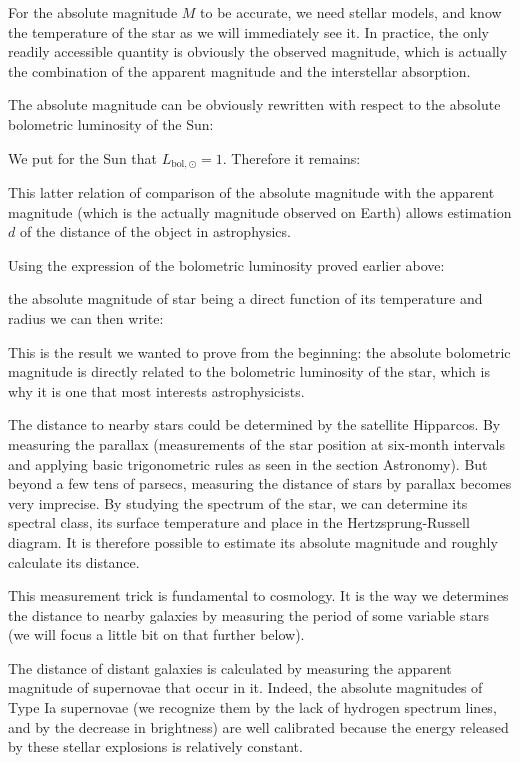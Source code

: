 	\begin{tcolorbox}[title=Remark,colframe=black,arc=10pt]
	For the absolute magnitude $M$ to be accurate, we need stellar models, and know the temperature of the star as we will immediately see it. In practice, the only readily accessible quantity is obviously the observed magnitude, which is actually the combination of the apparent magnitude and the interstellar absorption.
	\end{tcolorbox}
	The absolute magnitude can be obviously rewritten with respect to the absolute bolometric luminosity of the Sun:	
	
	We put for the Sun that $L_{\text{bol},\odot}=1$. Therefore it remains:
	
	
	This latter relation of comparison of the absolute magnitude with the apparent magnitude (which is the actually magnitude observed on Earth) allows estimation $d$ of the distance of the object in astrophysics.
	
	Using the expression of the bolometric luminosity proved earlier above:
	
	the absolute magnitude of star being a direct function of its temperature and radius we can then write:
	
	This is the result we wanted to prove from the beginning: the absolute bolometric magnitude is directly related to the bolometric luminosity of the star, which is why it is one that most interests astrophysicists.
	\begin{tcolorbox}[title=Remark,colframe=black,arc=10pt]
	The distance to nearby stars could be determined by the satellite Hipparcos. By measuring the parallax (measurements of the star position at six-month intervals and applying basic trigonometric rules as seen in the section Astronomy). But beyond a few tens of parsecs, measuring the distance of stars by parallax becomes very imprecise. By studying the spectrum of the star, we can determine its spectral class, its surface temperature and place in the Hertzsprung-Russell diagram. It is therefore possible to estimate its absolute magnitude and roughly calculate its distance.
	\end{tcolorbox}
	This measurement trick is fundamental to cosmology. It is the way we determines the distance to nearby galaxies by measuring the period of some variable stars (we will focus a little bit on that further below).

	The distance of distant galaxies is calculated by measuring the apparent magnitude of supernovae that occur in it. Indeed, the absolute magnitudes of Type Ia supernovae (we recognize them by the lack of hydrogen spectrum lines, and by the decrease in brightness) are well calibrated because the energy released by these stellar explosions is relatively constant.
	

